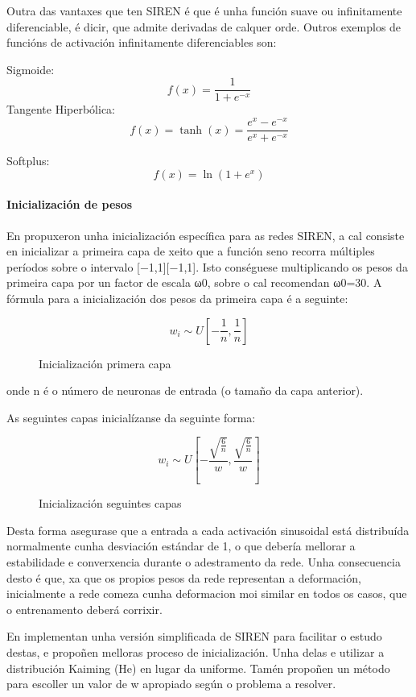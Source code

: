Outra das vantaxes que ten SIREN é que é unha función suave ou infinitamente diferenciable, é dicir, que admite derivadas de calquer orde.
Outros exemplos de funcións de activación infinitamente diferenciables son:

Sigmoide:  
\[
f(x) = \frac{1}{1 + e^{-x}}
\]
Tangente Hiperbólica:  
\[
f(x) = \tanh(x) = \frac{e^x - e^{-x}}{e^x + e^{-x}}
\]

Softplus:  
\[
f(x) = \ln(1 + e^x)
\]


\paragraph{Inicialización de pesos}

En \cite{sitzmann2020implicitneuralrepresentationsperiodic} propuxeron unha inicialización específica para as redes SIREN, 
a cal consiste en inicializar a primeira capa de xeito que a función seno recorra múltiples períodos sobre o intervalo [−1,1][−1,1].
Isto conséguese multiplicando os pesos da primeira capa por un factor de escala ω0, sobre o cal recomendan ω0=30.
A fórmula para a inicialización dos pesos da primeira capa é a seguinte:

\begin{figure}[ht!]
    \centering
    \[
    w_i \sim U\left[ -\frac{1}{n}, \frac{1}{n} \right]
    \]

\caption{Inicialización primera capa}
\end{figure}

onde n é o número de neuronas de entrada (o tamaño da capa anterior).

As seguintes capas inicialízanse da seguinte forma:
\begin{figure}[ht!]
    \centering
    \[
    w_i \sim U\left[ -\frac{\sqrt{\frac{6}{n}}}{w}, \frac{\sqrt{\frac{6}{n}}}{w} \right]
    \]
    \caption{Inicialización seguintes capas}
\end{figure}

Desta forma asegurase que a entrada a cada activación sinusoidal está distribuída normalmente cunha desviación estándar de 1,
 o que debería mellorar a estabilidade e converxencia durante o adestramento da rede.
Unha consecuencia desto é que, xa que os propios pesos da rede representan a deformación, inicialmente a rede comeza cunha deformacion moi similar en todos os casos, que o entrenamento deberá corrixir.

En \cite{sireninit} implementan unha versión simplificada de SIREN para facilitar o estudo destas, 
e propoñen melloras proceso de inicialización. Unha delas e utilizar a distribución Kaiming (He) en lugar da uniforme.
Tamén propoñen un método para escoller un valor de w apropiado según o problema a resolver.

